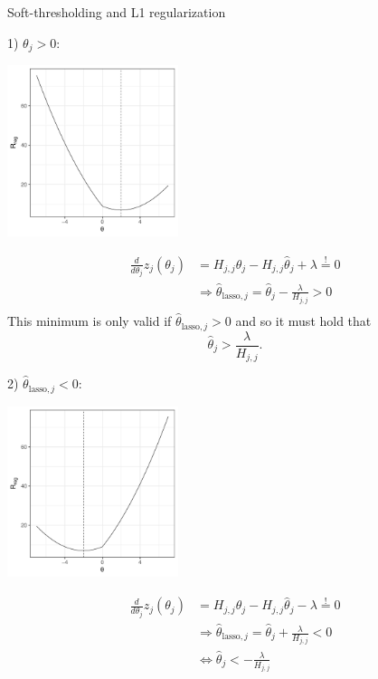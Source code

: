 \documentclass[11pt,compress,t,notes=noshow, xcolor=table]{beamer}
\begin{document}
\begin{vbframe}{Soft-thresholding and L1 regularization}
\framebreak

1) $\theta_j > 0:$ \\
\lz
\begin{minipage}{0.4\textwidth}
    \includegraphics[width=5cm]{figure/th_l1_pos.pdf}
\end{minipage}
\hfill
\begin{minipage}{0.49\textwidth}
\begin{align*}
    \frac{d}{d \theta_j}z_j(\theta_j) &= H_{j,j}\theta_j - H_{j,j} \hat{\theta}_j + \lambda \overset{!}{=} 0 \\
    &\Rightarrow  \hat{\theta}_{\text{lasso},j} = \hat{\theta}_j 
 -\frac{\lambda}{H_{j,j}} > 0 \\
 \end{align*}
 This minimum is only valid if $\hat{\theta}_{\text{lasso},j} > 0$ and so it must hold that
 \begin{equation*}
     \hat{\theta}_j >  \frac{\lambda}{H_{j,j}}.
 \end{equation*}
\end{minipage}
 \newpage

2) $\hat{\theta}_{\text{lasso},j} < 0:$ \\
\lz
\begin{minipage}{0.4\textwidth}
    \includegraphics[width=5cm]{figure/th_l1_neg.pdf}
\end{minipage}
\hfill
\begin{minipage}{0.49\textwidth}
\begin{align*}
    \frac{d}{d \theta_j}z_j(\theta_j) &= H_{j,j}\theta_j - H_{j,j} \hat{\theta}_j - \lambda \overset{!}{=} 0 \\
    &\Rightarrow  \hat{\theta}_{\text{lasso},j} = \hat{\theta}_j 
 +\frac{\lambda}{H_{j,j}} < 0 \\
 &\iff \hat{\theta}_j < -\frac{\lambda}{H_{j,j}}
\end{align*}
\end{minipage}
 \newpage



\end{vbframe}
\end{document}
